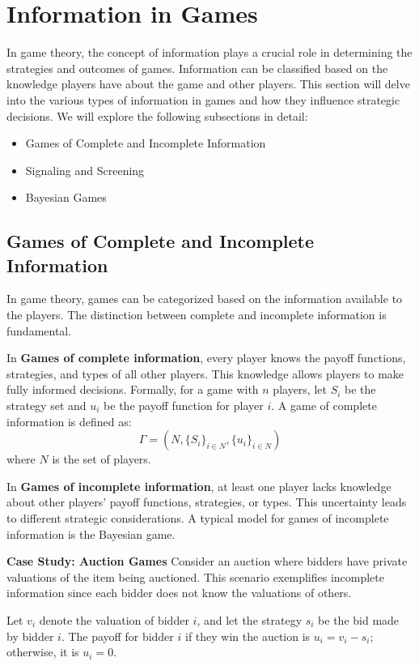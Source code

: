 \documentclass[12pt]{book} %
\begin{document}
\section{Information in Games}
In game theory, the concept of information plays a crucial role in determining the strategies and outcomes of games. Information can be classified based on the knowledge players have about the game and other players. This section will delve into the various types of information in games and how they influence strategic decisions. We will explore the following subsections in detail:

\begin{itemize}
    \item Games of Complete and Incomplete Information
    \item Signaling and Screening
    \item Bayesian Games
\end{itemize}

\subsection{Games of Complete and Incomplete Information}
In game theory, games can be categorized based on the information available to the players. The distinction between complete and incomplete information is fundamental.

In \textbf{Games of complete information}, every player knows the payoff functions, strategies, and types of all other players. This knowledge allows players to make fully informed decisions. Formally, for a game with $n$ players, let $S_i$ be the strategy set and $u_i$ be the payoff function for player $i$. A game of complete information is defined as:
\[ \Gamma = (N, \{S_i\}_{i \in N}, \{u_i\}_{i \in N}) \]
where $N$ is the set of players.

In \textbf{Games of incomplete information}, at least one player lacks knowledge about other players' payoff functions, strategies, or types. This uncertainty leads to different strategic considerations. A typical model for games of incomplete information is the Bayesian game.

\textbf{Case Study: Auction Games}
Consider an auction where bidders have private valuations of the item being auctioned. This scenario exemplifies incomplete information since each bidder does not know the valuations of others.

Let $v_i$ denote the valuation of bidder $i$, and let the strategy $s_i$ be the bid made by bidder $i$. The payoff for bidder $i$ if they win the auction is $u_i = v_i - s_i$; otherwise, it is $u_i = 0$.
\end{document}
